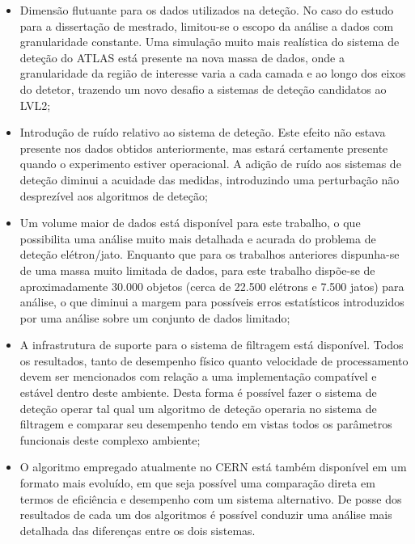 \begin{itemize}
\item Dimensão flutuante para os dados utilizados na deteção. No caso do
estudo para a dissertação de mestrado, limitou-se o escopo da análise a dados
com granularidade constante. Uma simulação muito mais realística do sistema de
deteção do ATLAS está presente na nova massa de dados, onde a granularidade da
região de interesse varia a cada camada e ao longo dos eixos do detetor,
trazendo um novo desafio a sistemas de deteção candidatos ao LVL2;

\item Introdução de ruído relativo ao sistema de deteção. Este efeito não
estava presente nos dados obtidos anteriormente, mas estará certamente
presente quando o experimento estiver operacional. A adição de ruído aos
sistemas de deteção diminui a acuidade das medidas, introduzindo uma
perturbação não desprezível aos algoritmos de deteção;

\item Um volume maior de dados está disponível para este trabalho, o que
possibilita uma análise muito mais detalhada e acurada do problema de deteção
elétron/jato. Enquanto que para os trabalhos anteriores dispunha-se de uma
massa muito limitada de dados, para este trabalho dispõe-se de aproximadamente
30.000 objetos (cerca de 22.500 elétrons e 7.500 jatos) para análise, o que
diminui a margem para possíveis erros estatísticos introduzidos por uma
análise sobre um conjunto de dados limitado;

\item A infrastrutura de suporte para o sistema de filtragem está
disponível. Todos os resultados, tanto de desempenho físico quanto velocidade
de processamento devem ser mencionados com relação a uma implementação
compatível e estável dentro deste ambiente. Desta forma é possível fazer o
sistema de deteção operar tal qual um algoritmo de deteção operaria no sistema
de filtragem e comparar seu desempenho tendo em vistas todos os parâmetros
funcionais deste complexo ambiente;

\item O algoritmo empregado atualmente no CERN está também disponível em um
formato mais evoluído, em que seja possível uma comparação direta em termos de
eficiência e desempenho com um sistema alternativo. De posse dos resultados de
cada um dos algoritmos é possível conduzir uma análise mais detalhada das
diferenças entre os dois sistemas.
\end{itemize}


